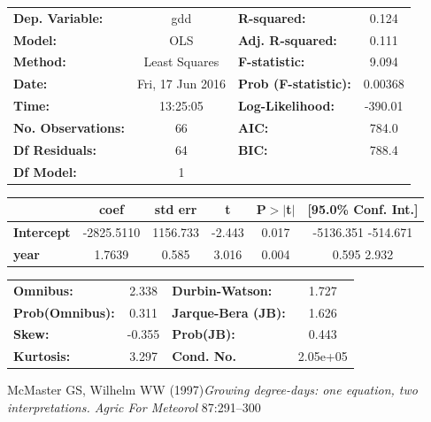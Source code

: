 \documentclass[12pt]{article}
\begin{document}
\begin{center}
\begin{tabular}{lclc}
\toprule
\textbf{Dep. Variable:}    &       gdd        & \textbf{  R-squared:         } &     0.124   \\
\textbf{Model:}            &       OLS        & \textbf{  Adj. R-squared:    } &     0.111   \\
\textbf{Method:}           &  Least Squares   & \textbf{  F-statistic:       } &     9.094   \\
\textbf{Date:}             & Fri, 17 Jun 2016 & \textbf{  Prob (F-statistic):} &  0.00368    \\
\textbf{Time:}             &     13:25:05     & \textbf{  Log-Likelihood:    } &   -390.01   \\
\textbf{No. Observations:} &          66      & \textbf{  AIC:               } &     784.0   \\
\textbf{Df Residuals:}     &          64      & \textbf{  BIC:               } &     788.4   \\
\textbf{Df Model:}         &           1      & \textbf{                     } &             \\
\bottomrule
\end{tabular}
\begin{tabular}{lccccc}
                   & \textbf{coef} & \textbf{std err} & \textbf{t} & \textbf{P$>$$|$t$|$} & \textbf{[95.0\% Conf. Int.]}  \\
\midrule
\textbf{Intercept} &   -2825.5110  &     1156.733     &    -2.443  &         0.017        &     -5136.351  -514.671       \\
\textbf{year}      &       1.7639  &        0.585     &     3.016  &         0.004        &         0.595     2.932       \\
\bottomrule
\end{tabular}
\begin{tabular}{lclc}
\textbf{Omnibus:}       &  2.338 & \textbf{  Durbin-Watson:     } &    1.727  \\
\textbf{Prob(Omnibus):} &  0.311 & \textbf{  Jarque-Bera (JB):  } &    1.626  \\
\textbf{Skew:}          & -0.355 & \textbf{  Prob(JB):          } &    0.443  \\
\textbf{Kurtosis:}      &  3.297 & \textbf{  Cond. No.          } & 2.05e+05  \\
\bottomrule
\end{tabular}
\end{center}







\begin{thebibliography}{99}

McMaster GS, Wilhelm WW (1997){\em Growing degree-days: one equation, two interpretations. Agric For Meteorol} 87:291–300




\end{thebibliography}
\end{document}
